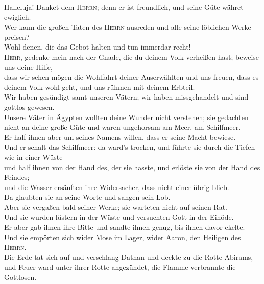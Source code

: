  Halleluja! Danket dem \textsc{Herrn}; denn er ist
freundlich, und seine Güte währet ewiglich.\\
 Wer kann die großen Taten des \textsc{Herrn} ausreden und
alle seine löblichen Werke preisen?\\
 Wohl denen, die das Gebot halten und tun immerdar
recht!\\
 \textsc{Herr}, gedenke mein nach der Gnade, die du deinem
Volk verheißen hast; beweise uns deine Hilfe,\\
 dass wir sehen mögen die Wohlfahrt deiner Auserwählten
und uns freuen, dass es deinem Volk wohl geht, und uns rühmen mit deinem
Erbteil.\\
 Wir haben gesündigt samt unseren Vätern; wir haben
missgehandelt und sind gottlos gewesen.\\
 Unsere Väter in Ägypten wollten deine Wunder nicht
verstehen; sie gedachten nicht an deine große Güte und waren ungehorsam
am Meer, am Schilfmeer.\\
 Er half ihnen aber um seines Namens willen, dass er seine
Macht bewiese.\\
 Und er schalt das Schilfmeer: da ward's trocken, und
führte sie durch die Tiefen wie in einer Wüste\\
 und half ihnen von der Hand des, der sie hasste, und
erlöste sie von der Hand des Feindes;\\
 und die Wasser ersäuften ihre Widersacher, dass nicht
einer übrig blieb.\\
 Da glaubten sie an seine Worte und sangen sein Lob.\\
 Aber sie vergaßen bald seiner Werke; sie warteten nicht
auf seinen Rat.\\
 Und sie wurden lüstern in der Wüste und versuchten Gott
in der Einöde.\\
 Er aber gab ihnen ihre Bitte und sandte ihnen genug, bis
ihnen davor ekelte.\\
 Und sie empörten sich wider Mose im Lager, wider Aaron,
den Heiligen des \textsc{Herrn}.\\
 Die Erde tat sich auf und verschlang Dathan und deckte
zu die Rotte Abirams,\\
 und Feuer ward unter ihrer Rotte angezündet, die Flamme
verbrannte die Gottlosen.\\
